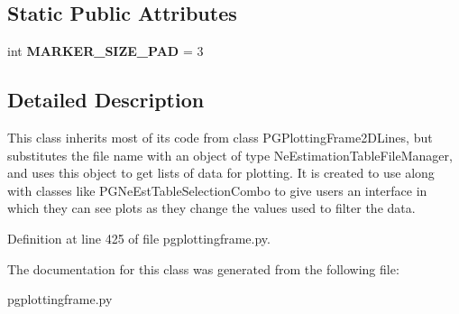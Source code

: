 \subsection*{Static Public Attributes}
\begin{DoxyCompactItemize}
\item 
int {\bfseries M\+A\+R\+K\+E\+R\+\_\+\+S\+I\+Z\+E\+\_\+\+P\+AD} = 3\hypertarget{classnegui_1_1pgplottingframe_1_1PGPlottingFrame2DLinesFromFileManager_ab1d7c5dc1907c2cbdf725dee2c8aba35}{}\label{classnegui_1_1pgplottingframe_1_1PGPlottingFrame2DLinesFromFileManager_ab1d7c5dc1907c2cbdf725dee2c8aba35}

\end{DoxyCompactItemize}


\subsection{Detailed Description}
\begin{DoxyVerb}This class inherits most of its code from class PGPlottingFrame2DLines,
but substitutes the file name with an object of type NeEstimationTableFileManager,
and uses this object to get lists of data for plotting.  It is created to use along
with classes like PGNeEstTableSelectionCombo to give users an interface in which
they can see plots as they change the values used to filter the data.
\end{DoxyVerb}
 

Definition at line 425 of file pgplottingframe.\+py.



The documentation for this class was generated from the following file\+:\begin{DoxyCompactItemize}
\item 
pgplottingframe.\+py\end{DoxyCompactItemize}
